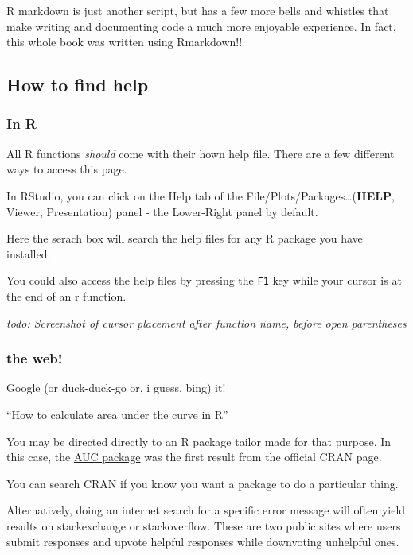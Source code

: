 \documentclass[
]{book}
\begin{document}
R markdown is just another script, but has a few more bells and whistles that make writing and documenting code a much more enjoyable experience. In fact, this whole book was written using Rmarkdown!!

\hypertarget{how-to-find-help}{%
\subsection*{How to find help}\label{how-to-find-help}}

\hypertarget{in-r}{%
\subsubsection{In R}\label{in-r}}

All R functions \emph{should} come with their hown help file. There are a few different ways to access this page.

In RStudio, you can click on the Help tab of the File/Plots/Packages\ldots(\textbf{HELP}, Viewer, Presentation) panel - the Lower-Right panel by default.

Here the serach box will search the help files for any R package you have installed.

You could also access the help files by pressing the \texttt{F1} key while your cursor is at the end of an r function.

\emph{todo: Screenshot of cursor placement after function name, before open parentheses}

\hypertarget{the-web}{%
\subsubsection{the web!}\label{the-web}}

Google (or duck-duck-go or, i guess, bing) it!

``How to calculate area under the curve in R''

You may be directed directly to an R package tailor made for that purpose. In this case, the \href{https://search.r-project.org/CRAN/refmans/DescTools/html/AUC.html}{AUC package} was the first result from the official CRAN page.

You can search CRAN if you know you want a package to do a particular thing.

Alternatively, doing an internet search for a specific error message will often yield results on stackexchange or stackoverflow. These are two public sites where users submit responses and upvote helpful responses while downvoting unhelpful ones.
\end{document}
